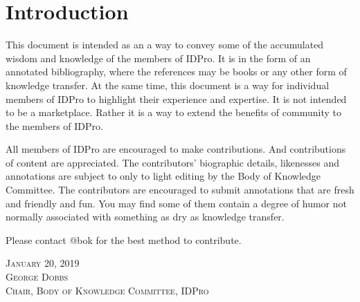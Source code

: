 \section{Introduction}
This document is intended as an a way to convey some of the accumulated wisdom and knowledge of the members of IDPro. 
It is in the form of an annotated bibliography, where the references may be books or any other form of knowledge transfer.  At the same time, this document is a way for individual members of IDPro to highlight their experience and expertise.  It is not intended to be a marketplace.  Rather it is a way to extend the benefits of community to the members of IDPro.

All members of IDPro are encouraged to make contributions.  And contributions of content are appreciated. The contributors' biographic details,  likenesses and annotations are subject to only to light editing by the Body of Knowledge Committee.  The contributors are encouraged to submit annotations that are fresh and friendly and fun. You may find some of them contain a degree of humor not normally associated with something as dry as knowledge transfer.

Please contact @bok for the best method to contribute.

\vspace{24pt}
{\setlength{\parindent}{0cm}
\textsc{
January 20, 2019\\
George Dobbs\\
Chair, Body of Knowledge Committee, IDPro}
}
